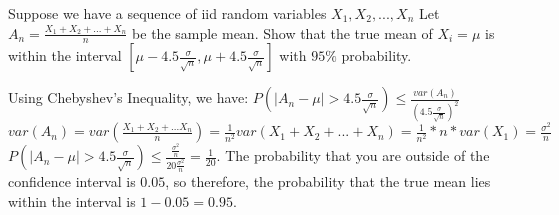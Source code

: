 \question Suppose we have a sequence of iid random variables $X_1, X_2, ... , X_n$ \newline
Let $A_n = \frac{X_1 + X_2 + ... + X_n}{n}$ be the sample mean. \newline 
Show that the true mean of $X_i = \mu$ is within the interval 
$[\mu - 4.5\frac{\sigma}{\sqrt{n}}, \mu + 4.5\frac{\sigma}{\sqrt{n}}]$ with $95\%$ probability. 
\begin{solution}[2cm]
	Using Chebyshev's Inequality, we have: \newline 
	$P(|A_n - \mu| > 4.5\frac{\sigma}{\sqrt{n}}) \leq \frac{var(A_n)}{(4.5\frac{\sigma}{\sqrt{n}})^2}$ \newline
	$var(A_n) = var(\frac{X_1 + X_2 + ... X_n}{n}) = \frac{1}{n^2}var(X_1 + X_2 + ... + X_n)
	= \frac{1}{n^2} * n * var(X_1) = \frac{\sigma^2}{n}$ \newline 
	$P(|A_n - \mu| > 4.5\frac{\sigma}{\sqrt{n}}) \leq \frac{\frac{\sigma^2}{n}}{20 \frac{\sigma^2}{n}} = \frac{1}{20}$. \newline 
	The probability that you are outside of the confidence interval is $0.05$, so therefore, the probability that the true mean lies within the interval is $1-0.05 = 0.95$.
\end{solution}